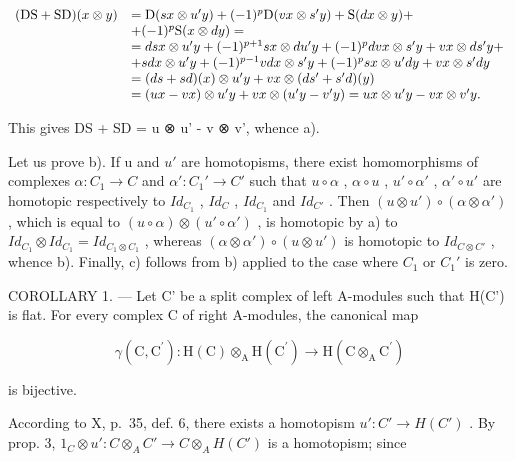 \[
\begin{array}{r l} (\mathrm{DS} + \mathrm{SD}) (x \otimes y) & = \mathrm{D} (s x \otimes u ^ {\prime} y) + (- 1) ^ {p} \mathrm{D} (v x \otimes s ^ {\prime} y) + \mathrm{S} (d x \otimes y) + \\ & + (- 1) ^ {p} \mathrm{S} (x \otimes d y) = \\ & = d s x \otimes u ^ {\prime} y + (- 1) ^ {p + 1} s x \otimes d u ^ {\prime} y + (- 1) ^ {p} d v x \otimes s ^ {\prime} y + v x \otimes d s ^ {\prime} y + \\ & + s d x \otimes u ^ {\prime} y + (- 1) ^ {p - 1} v d x \otimes s ^ {\prime} y + (- 1) ^ {p} s x \otimes u ^ {\prime} d y + v x \otimes s ^ {\prime} d y \\ & = (d s + s d) (x) \otimes u ^ {\prime} y + v x \otimes (d s ^ {\prime} + s ^ {\prime} d) (y) \\ & = (u x - v x) \otimes u ^ {\prime} y + v x \otimes (u ^ {\prime} y - v ^ {\prime} y) = u x \otimes u ^ {\prime} y - v x \otimes v ^ {\prime} y. \end{array}
\]

This gives DS + SD = u ⊗ u' - v ⊗ v', whence a).

Let us prove b). If u and \(u'\) are homotopisms, there exist homomorphisms of complexes \(\alpha: C_{1} \to C\) and \(\alpha': C_{1}' \to C'\) such that \(u \circ \alpha\) , \(\alpha \circ u\) , \(u' \circ \alpha'\) , \(\alpha' \circ u'\) are homotopic respectively to \(Id_{C_{1}}\) , \(Id_{C}\) , \(Id_{C_{1}}\) and \(Id_{C'}\) . Then \((u \otimes u') \circ (\alpha \otimes \alpha')\) , which is equal to \((u \circ \alpha) \otimes (u' \circ \alpha')\) , is homotopic by a) to \(Id_{C_{1}} \otimes Id_{C_{1}} = Id_{C_{1} \otimes C_{1}}\) , whereas \((\alpha \otimes \alpha') \circ (u \otimes u')\) is homotopic to \(Id_{C \otimes C'}\) , whence b). Finally, c) follows from b) applied to the case where \(C_{1}\) or \(C_{1}'\) is zero.

COROLLARY 1. --- Let C' be a split complex of left A-modules such that H(C') is flat. For every complex C of right A-modules, the canonical map

\[
\gamma (\mathrm{C}, \mathrm{C} ^ {\prime}): \mathrm{H} (\mathrm{C}) \otimes_ {\mathrm{A}} \mathrm{H} (\mathrm{C} ^ {\prime}) \rightarrow \mathrm{H} (\mathrm{C} \otimes_ {\mathrm{A}} \mathrm{C} ^ {\prime})
\]

is bijective.

According to X, p.~35, def. 6, there exists a homotopism \(u': C' \to H(C')\) . By prop. 3, \(1_{C} \otimes u': C \otimes_{A} C' \to C \otimes_{A} H(C')\) is a homotopism; since

